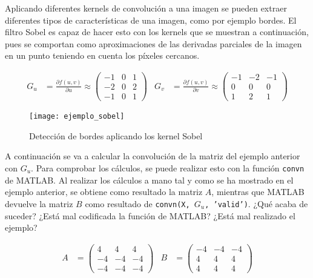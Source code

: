 		Aplicando diferentes kernels de convolución a una imagen se pueden extraer diferentes tipos de características de una imagen, como por ejemplo bordes. El filtro Sobel es capaz de hacer esto con los kernels que se muestran a continuación, pues se comportan como aproximaciones de las derivadas parciales de la imagen en un punto teniendo en cuenta los píxeles cercanos. 
		
		\begin{align*}
			G_u &= \frac{\partial f(u, v)}{\partial u} \approx \begin{pmatrix}
				-1 & 0 & 1\\
				-2 & 0 & 2\\
				-1 & 0 & 1
			\end{pmatrix}&
			G_v &= \frac{\partial f(u, v)}{\partial v} \approx \begin{pmatrix}
				-1 & -2 & -1\\
				0 & 0 & 0\\
				1 & 2 & 1
			\end{pmatrix}
		\end{align*}
		
		\begin{figure}[!h]
			\centering
			\texttt{[image: ejemplo\_sobel]}
			\caption{Detección de bordes aplicando los kernel Sobel}
			\label{fig:sobel}
		\end{figure}
		
		A continuación se va a calcular la convolución de la matriz del ejemplo anterior con $G_u$. Para comprobar los cálculos, se puede realizar esto con la función \texttt{convn} de MATLAB. Al realizar los cálculos a mano tal y como se ha mostrado en el ejemplo anterior, se obtiene como resultado la matriz $A$, mientras que MATLAB devuelve la matriz $B$ como resultado de \texttt{convn(X, $G_u$, 'valid')}. ¿Qué acaba de suceder? ¿Está mal codificada la función de MATLAB? ¿Está mal realizado el ejemplo?
		
		\begin{align*} A &= 
			\begin{pmatrix}
				4 & 4 & 4\\
				-4 & -4 & -4\\
				-4 & -4 & -4
			\end{pmatrix}&
			B &= \begin{pmatrix}
				-4 & -4 & -4\\
				4 & 4 & 4\\
				4 & 4 & 4
				\end{pmatrix}
		\end{align*}
		
